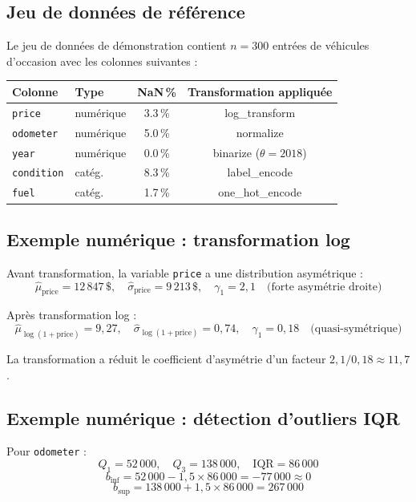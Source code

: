 \documentclass[12pt,a4paper]{article}
\begin{document}
\subsection{Jeu de données de référence}

Le jeu de données de démonstration contient $n = 300$ entrées de véhicules d'occasion
avec les colonnes suivantes :

\begin{center}
\renewcommand{\arraystretch}{1.3}
\begin{tabular}{llcc}
  \toprule
  \textbf{Colonne} & \textbf{Type} & \textbf{NaN\,\%} & \textbf{Transformation appliquée} \\
  \midrule
  \texttt{price}       & numérique & 3.3\,\%  & log\_transform \\
  \texttt{odometer}    & numérique & 5.0\,\%  & normalize \\
  \texttt{year}        & numérique & 0.0\,\%  & binarize ($\theta=2018$) \\
  \texttt{condition}   & catég.    & 8.3\,\%  & label\_encode \\
  \texttt{fuel}        & catég.    & 1.7\,\%  & one\_hot\_encode \\
  \bottomrule
\end{tabular}
\end{center}

\subsection{Exemple numérique : transformation log}

Avant transformation, la variable \texttt{price} a une distribution asymétrique :
\[
  \hat{\mu}_{\text{price}} = 12\,847\,\$,\quad
  \hat{\sigma}_{\text{price}} = 9\,213\,\$,\quad
  \gamma_1 = 2{,}1 \quad \text{(forte asymétrie droite)}
\]

Après transformation log :
\[
  \hat{\mu}_{\log(1+\text{price})} = 9{,}27,\quad
  \hat{\sigma}_{\log(1+\text{price})} = 0{,}74,\quad
  \gamma_1 = 0{,}18 \quad \text{(quasi-symétrique)}
\]

La transformation a réduit le coefficient d'asymétrie d'un facteur
$2{,}1 / 0{,}18 \approx 11{,}7$.

\subsection{Exemple numérique : détection d'outliers IQR}

Pour \texttt{odometer} :
\[
  Q_1 = 52\,000,\quad Q_3 = 138\,000,\quad
  \text{IQR} = 86\,000
\]
\[
  b_{\text{inf}} = 52\,000 - 1{,}5 \times 86\,000 = -77\,000 \approx 0
\]
\[
  b_{\text{sup}} = 138\,000 + 1{,}5 \times 86\,000 = 267\,000
\]
\end{document}
